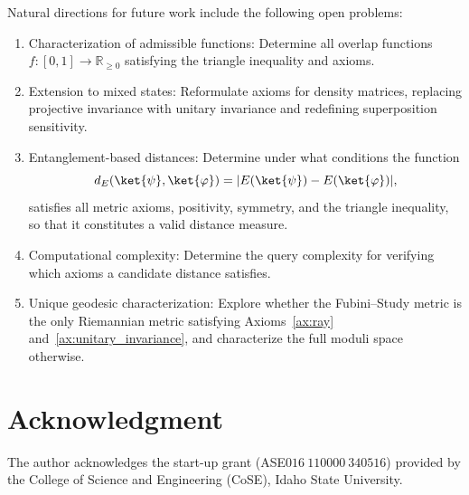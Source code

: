 \documentclass[aps,pra,reprint,nofootinbib,showpacs,superscriptaddress]{revtex4-1}
\begin{document}
\medskip
\noindent Natural directions for future work include the following open problems:

\begin{enumerate}[label=(\roman*)]
\item {Characterization of admissible functions:} Determine all overlap functions $f: [0,1] \to \mathbb{R}_{\ge 0}$ satisfying the triangle inequality and axioms.
\item {Extension to mixed states:} Reformulate axioms for density matrices, replacing projective invariance with unitary invariance and redefining superposition sensitivity.
\item {Entanglement-based distances:} Determine under what conditions the function
\[
d_E(\ket{\psi},\ket{\varphi}) = |E(\ket{\psi}) - E(\ket{\varphi})|,
\]
satisfies all metric axioms, positivity, symmetry, and the triangle inequality, so that it constitutes a valid distance measure.

\item {Computational complexity:} Determine the query complexity for verifying which axioms a candidate distance satisfies.
\item {Unique geodesic characterization:} Explore whether the Fubini--Study metric is the only Riemannian metric satisfying Axioms~\ref{ax:ray} and~\ref{ax:unitary_invariance}, and characterize the full moduli space otherwise.

\end{enumerate}

\section{Acknowledgment}
The author acknowledges the start-up grant (ASE$016~110000~340516$) provided by the College of Science and Engineering (CoSE), Idaho State University.

%  
% 













\end{document}
